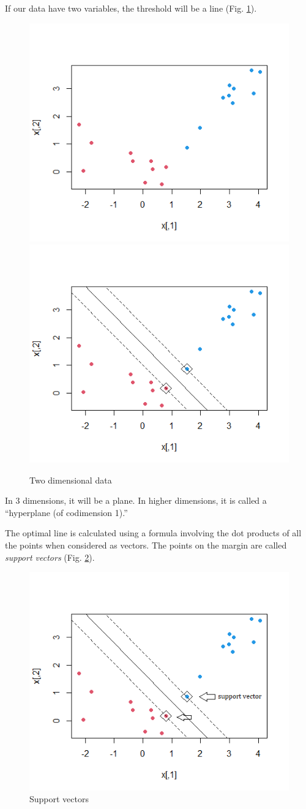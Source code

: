 \documentclass[
]{book}
\theoremstyle{definition}
\theoremstyle{definition}
\theoremstyle{definition}
\theoremstyle{definition}
\theoremstyle{remark}
\begin{document}
If our data have two variables, the threshold will be a line (Fig. \ref{fig:svm23}).

\begin{figure}

{\centering \includegraphics[width=0.4\linewidth]{images/svd21} \includegraphics[width=0.4\linewidth]{images/svd3} 

}

\caption{Two dimensional data}\label{fig:svm23}
\end{figure}

In 3 dimensions, it will be a plane. In higher dimensions, it is called a ``hyperplane (of codimension 1).''

The optimal line is calculated using a formula involving the dot products of all the points when considered as vectors. The points on the margin are called \emph{support vectors} (Fig. \ref{fig:svm3a}).

\begin{figure}

{\centering \includegraphics[width=0.7\linewidth]{images/svd3a} 

}

\caption{Support vectors}\label{fig:svm3a}
\end{figure}
\end{document}
